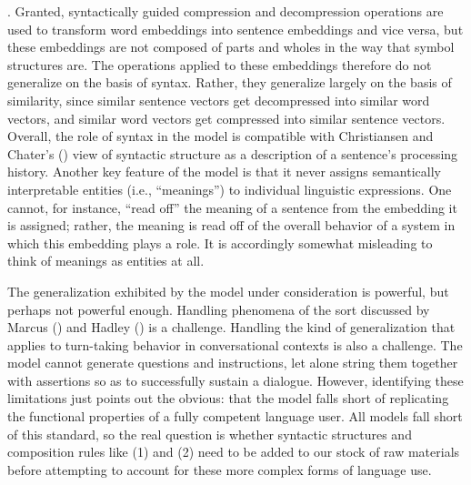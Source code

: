 . Granted, syntactically guided compression and decompression operations are used to transform word embeddings into sentence embeddings and vice versa, but these embeddings are not composed of parts and wholes in the way that symbol structures are. The operations applied to these embeddings therefore do not generalize on the basis of syntax. Rather, they generalize largely on the basis of similarity, since similar sentence vectors get decompressed into similar word vectors, and similar word vectors get compressed into similar sentence vectors. Overall, the role of syntax in the model is compatible with Christiansen and Chater's (\citeyear{Christiansen:2015}) view of syntactic structure as a description of a sentence's processing history. Another key feature of the model is that it never assigns semantically interpretable entities (i.e., ``meanings'') to individual linguistic expressions. One cannot, for instance, ``read off'' the meaning of a sentence from the embedding it is assigned; rather, the meaning is read off of the overall behavior of a system in which this embedding plays a role. It is accordingly somewhat misleading to think of meanings as entities at all.
 
The generalization exhibited by the model under consideration is powerful, but perhaps not powerful enough. Handling phenomena of the sort discussed by Marcus (\citeyear{Marcus:1998}) and Hadley (\citeyear{Hadley:2009}) is a challenge. Handling the kind of generalization that applies to turn-taking behavior in conversational contexts is also a challenge. The model cannot generate questions and instructions, let alone string them together with assertions so as to successfully sustain a dialogue. However, identifying these limitations just points out the obvious: that the model falls short of replicating the functional properties of a fully competent language user. All models fall short of this standard, so the real question is whether syntactic structures and composition rules like (1) and (2) need to be added to our stock of raw materials before attempting to account for these more complex forms of language use. 

